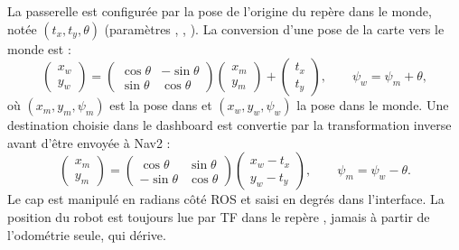La passerelle est configurée par la pose de l'origine du repère  dans le monde,
notée $(t_x, t_y, \theta)$ (paramètres , ,
). La conversion d'une pose de la carte vers le monde est :
\begin{equation}
\begin{pmatrix} x_w \\ y_w \end{pmatrix} =
\begin{pmatrix} \cos\theta & -\sin\theta \\ \sin\theta & \cos\theta \end{pmatrix}
\begin{pmatrix} x_m \\ y_m \end{pmatrix} +
\begin{pmatrix} t_x \\ t_y \end{pmatrix},
\qquad \psi_w = \psi_m + \theta,
\label{eq:map2world}
\end{equation}
où $(x_m, y_m, \psi_m)$ est la pose dans  et $(x_w, y_w, \psi_w)$ la pose dans
le monde. Une destination choisie dans le dashboard est convertie par la transformation
inverse avant d'être envoyée à Nav2 :
\begin{equation}
\begin{pmatrix} x_m \\ y_m \end{pmatrix} =
\begin{pmatrix} \cos\theta & \sin\theta \\ -\sin\theta & \cos\theta \end{pmatrix}
\begin{pmatrix} x_w - t_x \\ y_w - t_y \end{pmatrix},
\qquad \psi_m = \psi_w - \theta.
\label{eq:world2map}
\end{equation}
Le cap est manipulé en radians côté ROS et saisi en degrés dans l'interface. La position
du robot est toujours lue par TF dans le repère , jamais à partir de l'odométrie
seule, qui dérive.

